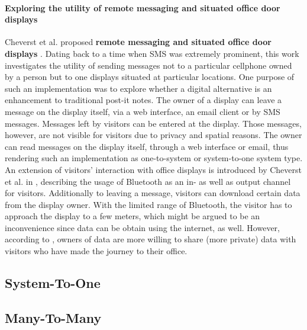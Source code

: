 \paragraph{Exploring the utility of remote messaging and situated office door displays}
Cheverst et al. proposed \textbf{remote messaging and situated office door displays} \cite{cheverst2003exploring}.
Dating back to a time when SMS was extremely prominent, this work investigates the utility of sending messages not to a particular cellphone owned by a person but to one displays situated at particular locations.
One purpose of such an implementation was to explore whether a digital alternative is an enhancement to traditional post-it notes.
The owner of a display can leave a message on the display itself, via a web interface, an email client or by SMS messages.
Messages left by visitors can be entered at the display.
Those messages, however, are not visible for visitors due to privacy and spatial reasons.
The owner can read messages on the display itself, through a web interface or email, thus rendering such an implementation as one-to-system or system-to-one system type.
An extension of visitors’ interaction with office displays is introduced by Cheverst et al. in \cite{cheverst2005exploring}, describing the usage of Bluetooth as an in- as well as output channel for visitors.
Additionally to leaving a message, visitors can download certain data from the display owner.
With the limited range of Bluetooth, the visitor has to approach the display to a few meters, which might be argued to be an inconvenience since data can be obtain using the internet, as well.
However, according to \cite{cheverst2005exploring}, owners of data are more willing to share (more private) data with visitors who have made the journey to their office.

\subsection{System-To-One}

\subsection{Many-To-Many}

